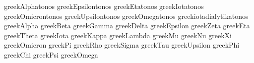 \stopencoding


\startencoding[uc]

 greekAlphatonos         {}
 greekEpsilontonos       {}
 greekEtatonos           {}
 greekIotatonos          {}
 greekOmicrontonos       {}
 greekUpsilontonos       {}
 greekOmegatonos         {}
 greekiotadialytikatonos {}
 greekAlpha              {}
 greekBeta               {}
 greekGamma              {}
 greekDelta              {}
 greekEpsilon            {}
 greekZeta               {}
 greekEta                {}
 greekTheta              {}
 greekIota               {}
 greekKappa              {}
 greekLambda             {}
 greekMu                 {}
 greekNu                 {}
 greekXi                 {}
 greekOmicron            {}
 greekPi                 {}
 greekRho                {}
 greekSigma              {}
 greekTau                {}
 greekUpsilon            {}
 greekPhi                {}
 greekChi                {}
 greekPsi                {}
 greekOmega              {}

